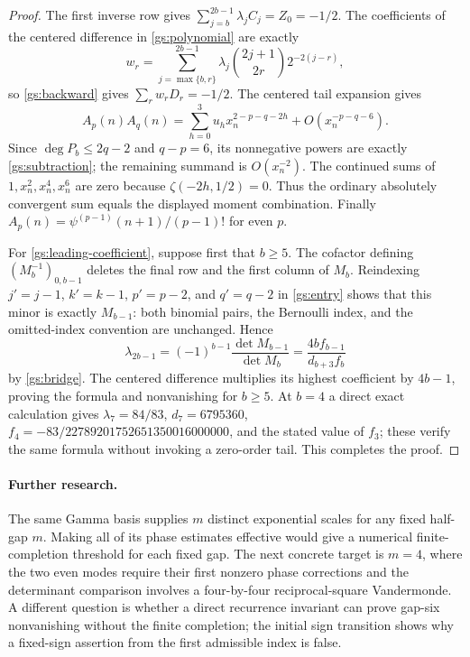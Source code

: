 \begin{proof}
The first inverse row gives
$\sum_{j=b}^{2b-1}\lambda_jC_j=Z_0=-1/2$.
The coefficients of the centered difference in
\eqref{gs:polynomial} are exactly
\[
 w_r=\sum_{j=\max\{b,r\}}^{2b-1}
       \lambda_j\binom{2j+1}{2r}2^{-2(j-r)},
\]
so \eqref{gs:backward} gives $\sum_rw_rD_r=-1/2$.
The centered tail expansion gives
\[
 A_p(n)A_q(n)=\sum_{h=0}^3u_hx_n^{2-p-q-2h}
                       +O(x_n^{-p-q-6}).
\]
Since $\deg P_b\le2q-2$ and $q-p=6$, its nonnegative powers
are exactly \eqref{gs:subtraction}; the remaining summand is
$O(x_n^{-2})$.  The continued sums of $1,x_n^2,x_n^4,x_n^6$
are zero because $\zeta(-2h,1/2)=0$.  Thus the ordinary
absolutely convergent sum equals the displayed moment combination.
Finally $A_p(n)=\psi^{(p-1)}(n+1)/(p-1)!$ for even $p$.

For \eqref{gs:leading-coefficient}, suppose first that $b\ge5$.
The cofactor defining $(M_b^{-1})_{0,b-1}$ deletes the final row
and the first column of $M_b$.  Reindexing $j'=j-1$, $k'=k-1$,
$p'=p-2$, and $q'=q-2$ in \eqref{gs:entry} shows that this
minor is exactly $M_{b-1}$: both binomial pairs, the Bernoulli
index, and the omitted-index convention are unchanged.  Hence
\[
 \lambda_{2b-1}=(-1)^{b-1}\frac{\det M_{b-1}}{\det M_b}
              =\frac{4bf_{b-1}}{d_{b+3}f_b}
\]
by \eqref{gs:bridge}.  The centered difference multiplies its
highest coefficient by $4b-1$, proving the formula and
nonvanishing for $b\ge5$.  At $b=4$ a direct exact calculation
gives $\lambda_7=84/83$, $d_7=6795360$,
$f_4=-83/22789201752651350016000000$, and the stated value of
$f_3$; these verify the same formula without invoking a
zero-order tail.  This completes the proof.
\end{proof}

\paragraph{Further research.}
The same Gamma basis supplies $m$ distinct exponential scales for
any fixed half-gap $m$.  Making all of its phase estimates effective
would give a numerical finite-completion threshold for each fixed
gap.  The next concrete target is $m=4$, where the two even modes
require their first nonzero phase corrections and the determinant
comparison involves a four-by-four reciprocal-square Vandermonde.
A different question is whether a direct recurrence invariant can
prove gap-six nonvanishing without the finite completion; the initial
sign transition shows why a fixed-sign assertion from the first
admissible index is false.
